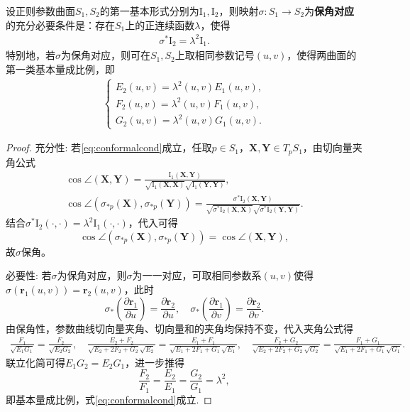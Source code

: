 \documentclass[../../main.tex]{subfiles}%
\begin{document}
\begin{theorem}
设正则参数曲面$S_1,S_2$的第一基本形式分别为$\mathrm{I}_1,\mathrm{I}_2$，则映射$\sigma:S_1\to S_2$为\textbf{保角对应}的充分必要条件是：存在$S_1$上的正连续函数$\lambda$，使得
\begin{align}
\sigma^*\mathrm{I}_2 = \lambda^2\mathrm{I}_1.
\label{eq:conformalcond}
\end{align}
特别地，若$\sigma$为保角对应，则可在$S_1,S_2$上取相同参数记号$(u,v)$，使得两曲面的第一类基本量成比例，即
\begin{align}
\begin{cases}
E_2(u,v)=\lambda^2(u,v)E_1(u,v),\\
F_2(u,v)=\lambda^2(u,v)F_1(u,v),\\
G_2(u,v)=\lambda^2(u,v)G_1(u,v).
\end{cases}
\label{eq:basicalpropconformal}
\end{align}
\end{theorem}

\begin{proof}

{\heiti 充分性}:
若\eqref{eq:conformalcond}成立，任取$p\in S_1$，$\bm X,\bm Y\in T_pS_1$，由切向量夹角公式
\begin{align}
\cos\angle(\bm X,\bm Y)=\frac{\mathrm{I}_1(\bm X,\bm Y)}{\sqrt{\mathrm{I}_1(\bm X,\bm X)}\sqrt{\mathrm{I}_1(\bm Y,\bm Y)}},\label{eq:anglecos1}\\
\cos\angle(\sigma_{*p}(\bm X),\sigma_{*p}(\bm Y))=\frac{\sigma^*\mathrm{I}_2(\bm X,\bm Y)}{\sqrt{\sigma^*\mathrm{I}_2(\bm X,\bm X)}\sqrt{\sigma^*\mathrm{I}_2(\bm Y,\bm Y)}}.\label{eq:anglecos2}
\end{align}
结合$\sigma^*\mathrm{I}_2(\cdot,\cdot)=\lambda^2\mathrm{I}_1(\cdot,\cdot)$，代入可得
$$\cos\angle(\sigma_{*p}(\bm X),\sigma_{*p}(\bm Y))=\cos\angle(\bm X,\bm Y),$$
故$\sigma$保角。

{\heiti 必要性}:
若$\sigma$为保角对应，则$\sigma$为一一对应，可取相同参数系$(u,v)$使得$\sigma(\bm r_1(u,v))=\bm r_2(u,v)$，此时
$$\sigma_*\left(\frac{\partial\bm r_1}{\partial u}\right)=\frac{\partial\bm r_2}{\partial u},\quad \sigma_*\left(\frac{\partial\bm r_1}{\partial v}\right)=\frac{\partial\bm r_2}{\partial v}.$$
由保角性，参数曲线切向量夹角、切向量和的夹角均保持不变，代入夹角公式得
\begin{align*}
\frac{F_1}{\sqrt{E_1G_1}}=\frac{F_2}{\sqrt{E_2G_2}},\quad
\frac{E_2+F_2}{\sqrt{E_2+2F_2+G_2}\sqrt{E_2}}=\frac{E_1+F_1}{\sqrt{E_1+2F_1+G_1}\sqrt{E_1}},\quad
\frac{F_2+G_2}{\sqrt{E_2+2F_2+G_2}\sqrt{G_2}}=\frac{F_1+G_1}{\sqrt{E_1+2F_1+G_1}\sqrt{G_1}}.
\end{align*}
联立化简可得$E_1G_2=E_2G_1$，进一步推得
$$\frac{F_2}{F_1}=\frac{E_2}{E_1}=\frac{G_2}{G_1}=\lambda^2,$$
即基本量成比例，式\eqref{eq:conformalcond}成立.

\end{proof}
\end{document}
